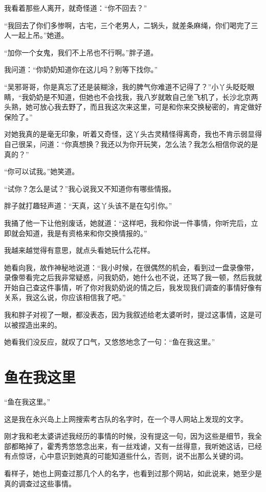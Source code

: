 我看着那些人离开，就奇怪道：“你不回去？”

“我回去了你们多惨啊，古宅，三个老男人，二锅头，就差条麻绳，你们喝完了三人一起上吊。”她道。

“加你一个女鬼，我们不上吊也不行啊。”胖子道。

我问道：“你奶奶知道你在这儿吗？别等下找你。”

“吴邪哥哥，你是真忘了还是装糊涂，我的脾气你难道不记得了？”小丫头眨眨眼睛，“我奶奶是不知道，但她也不会找我，我八岁就敢自己坐飞机了，长沙北京两头熟，她可放心我去野了，而且我这次来这里，可是和你来交换秘密的，肯定做好保险了。”

对她我真的是毫无印象，听着又奇怪，这丫头古灵精怪得离奇，我也不肯示弱显得自己很呆，问道：“你真想换？我还以为你开玩笑，怎么法？我怎么相信你说的是真的？”

“你可以试我。”她笑道。

“试你？怎么是试？”我心说我又不知道你有哪些情报。

胖子就打趣轻声道：“天真，这丫头该不是在勾引你。”

我捅了他一下让他别废话，她就道：“这样吧，我和你说一件事情，你听完后，立即就会知道，我是有资格来和你交换情报的。”

我越来越觉得有意思，就点头看她玩什么花样。

她看向我，故作神秘地说道：“我小时候，在很偶然的机会，看到过一盘录像带，录像带看完之后我非常疑惑，问我奶奶，她什么也不说，还骂了我一顿，然后我就开始自己查这件事情，听了你对我奶奶说的情之后，我发现我们调查的事情好像有关系，我这么说，你应该相信我了吧。”

我和胖子对视了一眼，都没表态，因为我叙述给老太婆听时，提过这事情，这是可以被捏造出来的。

她看我们没反应，就叹了口气，又悠悠地念了一句：“鱼在我这里。”

\chapter{鱼在我这里}

“鱼在我这里。”

这是我在永兴岛上上网搜索考古队的名字时，在一个寻人网站上发现的文字。

刚才我和老太婆讲述我经历的事情的时候，没有提这一句，因为这些是细节，我全部都略掉了，霍秀秀悠悠念出来，有一丝戏谑，又有一丝得意，我听她这话，已经有点惊讶，心中意识到她真的可能知道些什么，否则，说不出那么关键的词。

看样子，她也上网查过那几个人的名字，也看到过那个网站，如此说来，她至少是真的调查过这些事情。

